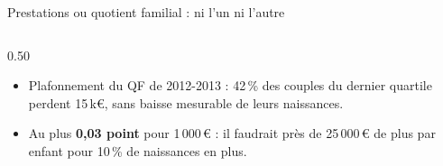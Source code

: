 \documentclass[10pt,aspectratio=169]{beamer}
\begin{document}
\begin{frame}{Prestations ou quotient familial : ni l'un ni l'autre}
\begin{columns}[T]
\begin{column}{0.50\textwidth}
      \small
      \begin{itemize}\setlength{\itemsep}{0.3em}
        \item Plafonnement du QF de 2012-2013 : 42\,\% des couples du dernier quartile perdent 15\,k€, sans baisse mesurable de leurs naissances.
        \item Au plus \textbf{0,03 point} pour 1\,000\,€ : il faudrait près de 25\,000\,€ de plus par enfant pour 10\,\% de naissances en plus.
      \end{itemize}
    \end{column}
  \end{columns}
\end{frame}
\end{document}
